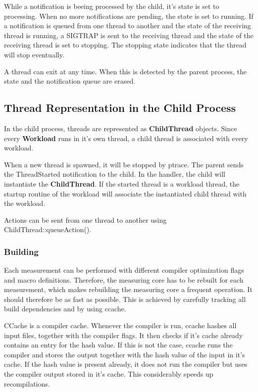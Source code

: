 \documentclass[a4paper,12pt]{article}
\newcommand{\class}[1]{\textbf{#1}}
\newcommand{\method}[1]{\textsf{#1}}
\begin{document}
While a notification is beeing processed by the child, it's state is set to
processing. When no more notifications are pending, the state is set to running.
If a notification is queued from one thread to another and the state of the
receiving thread is running, a SIGTRAP is sent to the receiving thread and the
state of the receiving thread is set to stopping. The stopping state indicates
that the thread will stop eventually.

A thread can exit at any time. When this is detected by the parent process, the
state and the notification queue are erased.

\subsection{Thread Representation in the Child Process}
In the child process, threads are represented as \class{ChildThread} objects.
Since every \class{Workload} runs in it's own thread, a child thread is
associated with every workload. 

When a new thread is spawned, it will be stopped by ptrace. The parent sends the
ThreadStarted notification to the child. In the handler, the child will
instantiate the \class{ChildThread}. If the started thread is a workload thread,
the startup routine of the workload will associate the instantiated child thread
with the workload.

Actions can be sent from one thread to another using
\method{ChildThread::queueAction()}. 

\subsubsection{Building}
Each measurement can be performed with different compiler optimization flags and
macro definitions. Therefore, the measuring core has to be rebuilt for each
measurement, which makes rebuilding the measuring core a frequent operation. It
should therefore be as fast as possible. This is achieved by carefully tracking
all build dependencies and by using ccache. 

CCache is a compiler cache. Whenever the compiler is run, ccache hashes all
input files, together with the compiler flags. It then checks if it's cache
already contains an entry for the hash value. If this is not the case, ccache
runs the compiler and stores the output together with the hash value of the
input in it's cache. If the hash value is present already, it does not run the
compiler but uses the compiler output stored in it's cache. This considerably
speeds up recompilations.
\end{document}
